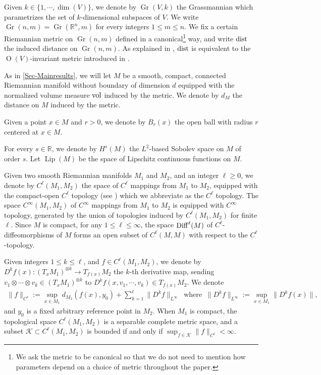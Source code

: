 \documentclass[11pt, leqno, fleqn]{amsart}
\def\clr{   \color{red}}
\def\clb{   \color{black}}
\newcommand{\SectionSymbol}{\textsection}
\def \R{{\mathbb R}}
\DeclareMathOperator{\Lip}{Lip}
\DeclareMathOperator{\Gr}{Gr}
\DeclareMathOperator{\OO}{O}
\newcommand{\cK}{{\mathcal K}}
\newcommand{\aryst}{\begin{eqnarray*}}
\newcommand{\earyst}{\end{eqnarray*}}
\theoremstyle{definition}
\DeclareMathOperator{\diff}{Diff}
\theoremstyle{definition}
\def \vol{  {\rm vol} }
\newcommand{\Diff}{{\rm Diff}}
\begin{document}
Given $k \in \{1, \cdots, \dim(V)\}$, we denote by $\Gr(V, k)$ the Grassmannian which parametrizes the set of $k$-dimensional subspaces of $V$. We write $\Gr(n, m) = \Gr(\R^n, m)$ for every integers $1 \leq m \leq n$.
 We fix a certain  Riemannian metric on $\Gr(n,m)$ defined in a canonical\footnote{We ask the metric to be canonical so that we do not need to mention how parameters depend on a choice of metric throughout the paper.} way, and write 
 ${\rm dist}$ the induced distance on $\Gr(n,m)$.  As explained in \cite{BH2}, ${\rm dist}$ is equivalent to the $\OO(V)$-invariant metric   introduced in  \cite[\SectionSymbol 1.3]{BH2}.
 \bigskip
 
 
As in \SectionSymbol \ref{Sec-Mainresults}, we will let $M$ be a smooth,  compact, connected Riemannian manifold without boundary of dimension $d$ equipped with the normalized volume measure $\vol$ induced by the metric.  We denote by $d_M$ the distance on $M$ induced by the   metric.
 
 
Given a point $x \in M$ and  $r > 0$, we denote by $B_r(x)$ the open ball with radius $r$ centered at  $x \in M$.


For every $s \in \R$,  we denote by $H^s(M)$ the $L^2$-based Sobolev space on $M$ of order $s$. Let $\Lip(M)$ be the space of Lipschitz continuous functions on $M$.

Given two smooth Riemannian manifolds $M_1$ and $M_2$, and an integer $\ell \geq 0$, we denote by $C^\ell(M_1, M_2)$ the space of $C^\ell$ mappings from $M_1$ to $M_2$, equipped with the compact-open $C^\ell$ topology  (see \cite[Chapter 2, Section 1]{H2}) which we abbreviate as the $C^\ell$ topology. The space $C^{\infty}(M_1, M_2)$ of $C^{\infty}$ mappings from $M_1$ to $M_2$ is equipped with $C^{\infty}$ topology, generated by the union of topologies induced by $C^\ell(M_1, M_2)$ for finite $\ell$. Since $M$ is compact, for any $1 \leq \ell \leq \infty$, the space $\Diff^\ell(M)$ of $C^\ell$-diffeomorphisms of $M$ forms an open subset of $C^\ell(M, M)$ with respect to the $C^\ell$-topology. 


 

Given integers  $1 \leq k \leq \ell$,  and $f \in  C^\ell(M_1, M_2)$, we denote by $D^k f(x) : (T_x M_1 )^{\otimes k} \to T_{f(x)} M_2$ the $k$-th derivative map, sending $v_1 \otimes \cdots \otimes v_k \in (T_x M_1)^{\otimes k}$ to $D^kf(x, v_1, \cdots, v_k) \in T_{f(x)}M_2$.
We denote
\aryst
 \| f \|_{C^\ell} :=  \sup_{x \in M_1} d_{M_{2}}(f(x), y_0) + \sum_{k = 1}^{\ell} \| D^k f \|_{L^{\infty}}  \ \mbox{ where } \   \| D^kf \|_{L^{\infty}} := \sup_{x \in M_1} \| D^k f(x)\|,  
\earyst
and $y_0$ is a fixed arbitrary reference point in $M_2$.
When $M_1$ is compact, the topological space $C^\ell(M_1, M_2)$ is a separable complete metric space, and a subset $\cK \subset C^\ell(M_1, M_2)$ is bounded if and only if 
$\sup_{f \in \cK} \| f \|_{C^\ell} < \infty$.
\end{document}
